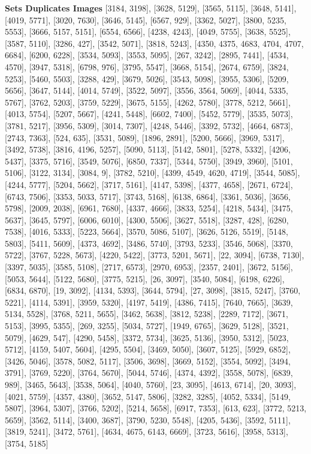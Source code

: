 \documentclass[letterpaper, 11pt]{IEEEtran}
\begin{document}
\textbf{Sets Duplicates Images}
[3184, 3198], [3628, 5129], [3565, 5115], [3648, 5141], [4019, 5771], [3020, 7630], [3646, 5145], [6567, 929], [3362, 5027], [3800, 5235, 5553], [3666, 5157, 5151], [6554, 6566], [4238, 4243], [4049, 5755], [3638, 5525], [3587, 5110], [3286, 427], [3542, 5071], [3818, 5243], [4350, 4375, 4683, 4704, 4707, 6684], [6200, 6228], [3534, 5093], [3553, 5095], [267, 3242], [2895, 7441], [4534, 4570], [3947, 5318], [6798, 976], [3795, 5547], [3668, 5154], [2674, 6759], [3824, 5253], [5460, 5503], [3288, 429], [3679, 5026], [3543, 5098], [3955, 5306], [5209, 5656], [3647, 5144], [4014, 5749], [3522, 5097], [3556, 3564, 5069], [4044, 5335, 5767], [3762, 5203], [3759, 5229], [3675, 5155], [4262, 5780], [3778, 5212, 5661], [4013, 5754], [5207, 5667], [4241, 5448], [6602, 7400], [5452, 5779], [3535, 5073], [3781, 5217], [3956, 5309], [3014, 7307], [4248, 5446], [3392, 5732], [4664, 6873], [2743, 7363], [524, 635], [3531, 5089], [1896, 2891], [5200, 5666], [3969, 5317], [3492, 5738], [3816, 4196, 5257], [5090, 5113], [5142, 5801], [5278, 5332], [4206, 5437], [3375, 5716], [3549, 5076], [6850, 7337], [5344, 5750], [3949, 3960], [5101, 5106], [3122, 3134], [3084, 9], [3782, 5210], [4399, 4549, 4620, 4719], [3544, 5085], [4244, 5777], [5204, 5662], [3717, 5161], [4147, 5398], [4377, 4658], [2671, 6724], [6743, 7506], [3353, 5033, 5717], [3743, 5168], [6138, 6864], [3361, 5036], [3656, 5798], [2009, 2038], [6961, 7680], [4337, 4666], [3833, 5254], [4218, 5434], [3475, 5637], [3645, 5797], [6006, 6010], [4300, 5506], [3627, 5518], [3287, 428], [6280, 7538], [4016, 5333], [5223, 5664], [3570, 5086, 5107], [3626, 5126, 5519], [5148, 5803], [5411, 5609], [4373, 4692], [3486, 5740], [3793, 5233], [3546, 5068], [3370, 5722], [3767, 5228, 5673], [4220, 5422], [3773, 5201, 5671], [22, 3094], [6738, 7130], [3397, 5035], [3585, 5108], [2717, 6573], [2970, 6953], [2357, 2401], [3672, 5156], [5053, 5644], [5122, 5680], [3775, 5215], [26, 3097], [3540, 5084], [6198, 6226], [6834, 6870], [19, 3092], [4134, 5393], [3644, 5794], [27, 3098], [3815, 5247], [3760, 5221], [4114, 5391], [3959, 5320], [4197, 5419], [4386, 7415], [7640, 7665], [3639, 5134, 5528], [3768, 5211, 5655], [3462, 5638], [3812, 5238], [2289, 7172], [3671, 5153], [3995, 5355], [269, 3255], [5034, 5727], [1949, 6765], [3629, 5128], [3521, 5079], [4629, 547], [4290, 5458], [3372, 5734], [3625, 5136], [3950, 5312], [5023, 5712], [4159, 5407, 5604], [4295, 5504], [3469, 5050], [3607, 5125], [5929, 6852], [3426, 5046], [3578, 5082, 5117], [3506, 3698], [3669, 5152], [3554, 5092], [3494, 3791], [3769, 5220], [3764, 5670], [5044, 5746], [4374, 4392], [3558, 5078], [6839, 989], [3465, 5643], [3538, 5064], [4040, 5760], [23, 3095], [4613, 6714], [20, 3093], [4021, 5759], [4357, 4380], [3652, 5147, 5806], [3282, 3285], [4052, 5334], [5149, 5807], [3964, 5307], [3766, 5202], [5214, 5658], [6917, 7353], [613, 623], [3772, 5213, 5659], [3562, 5114], [3400, 3687], [3790, 5230, 5548], [4205, 5436], [3592, 5111], [3819, 5241], [3472, 5761], [4634, 4675, 6143, 6669], [3723, 5616], [3958, 5313], [3754, 5185] 
\clearpage
\end{document}
